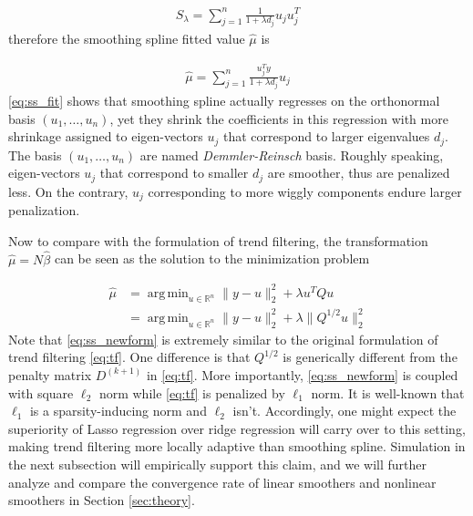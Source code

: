 \documentclass[a4paper]{article}
\DeclareMathOperator*{\argmin}{arg\,min}
\newcommand{\RR}{\mathbb{R}}
\begin{document}
\begin{align*}
S_\lambda = \sum_{j=1}^n \frac{1}{1+\lambda d_j}u_ju_j^T
\end{align*}
therefore the smoothing spline fitted value $\hat{\mu}$ is 

\begin{align}
\hat{\mu} = \sum_{j=1}^n \frac{u_j^Ty}{1+\lambda d_j}u_j
\label{eq:ss_fit}
\end{align}
\eqref{eq:ss_fit} shows that smoothing spline actually regresses on the orthonormal basis $(u_1,\ldots, u_n)$, yet they shrink the coefficients in this regression with more shrinkage assigned to eigen-vectors $u_j$ that correspond to larger eigenvalues $d_j$. The basis $(u_1,\ldots, u_n)$ are named \textit{Demmler-Reinsch} basis\cite{demmler1975oscillation}. Roughly speaking, eigen-vectors $u_j$ that correspond to smaller $d_j$ are smoother, thus are penalized less. On the contrary, $u_j$ corresponding to more wiggly components endure larger penalization. 

Now to compare with the formulation of trend filtering, the transformation $\hat{\mu} = N\hat{\beta}$ can be seen as the solution to the minimization problem

\begin{equation}
\begin{aligned}
\hat{\mu} &= \argmin_{u\in\RR^n} \|y-u\|_2^2 + \lambda u^TQu\\
&= \argmin_{u\in\RR^n} \|y-u\|_2^2 + \lambda\|Q^{1/2}u\|_2^2
\label{eq:ss_newform}
\end{aligned}
\end{equation}
Note that \eqref{eq:ss_newform} is extremely similar to the original formulation of trend filtering \eqref{eq:tf}. One difference is that $Q^{1/2}$ is generically different from the penalty matrix $D^{(k+1)}$ in \eqref{eq:tf}. More importantly, \eqref{eq:ss_newform} is coupled with square $\ell_2$ norm while \eqref{eq:tf} is penalized by $\ell_1$ norm. It is well-known that $\ell_1$ is a sparsity-inducing norm and $\ell_2$ isn't. Accordingly, one might expect the superiority of Lasso regression over ridge regression will carry over to this setting, making trend filtering more locally adaptive than smoothing spline. Simulation in the next subsection will empirically support this claim, and we will further analyze and compare the convergence rate of linear smoothers and nonlinear smoothers in Section \ref{sec:theory}.
\end{document}
